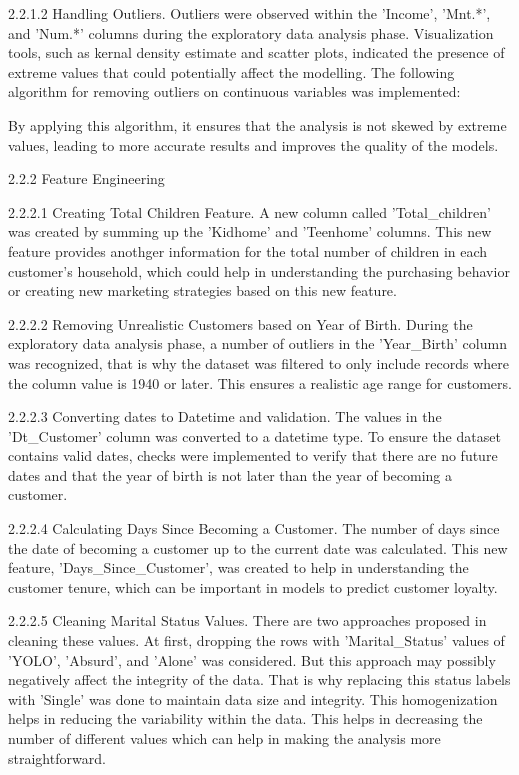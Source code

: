     2.2.1.2 Handling Outliers. Outliers were observed within the 'Income', 'Mnt.*', and 'Num.*' columns during the exploratory data analysis phase. Visualization tools, such as kernal density estimate and scatter plots, indicated the presence of extreme values that could potentially affect the modelling. The following algorithm for removing outliers on continuous variables was implemented:


    By applying this algorithm, it ensures that the analysis is not skewed by extreme values, leading to more accurate results and improves the quality of the models.

2.2.2 Feature Engineering

    2.2.2.1 Creating Total Children Feature. A new column called 'Total_children' was created by summing up the 'Kidhome' and 'Teenhome' columns. This new feature provides anothger information for the total number of children in each customer's household, which could help in understanding the purchasing behavior or creating new marketing strategies based on this new feature.

    2.2.2.2 Removing Unrealistic Customers based on Year of Birth. During the exploratory data analysis phase, a number of outliers in the 'Year_Birth' column was recognized, that is why the dataset was filtered to only include records where the column value is 1940 or later. This ensures a realistic age range for customers.

    2.2.2.3 Converting dates to Datetime and validation. The values in the 'Dt_Customer' column was converted to a datetime type. To ensure the dataset contains valid dates, checks were implemented to verify that there are no future dates and that the year of birth is not later than the year of becoming a customer.

    2.2.2.4 Calculating Days Since Becoming a Customer. The number of days since the date of becoming a customer up to the current date was calculated. This new feature, 'Days_Since_Customer', was created to help in understanding the customer tenure, which can be important in models to predict customer loyalty.

    2.2.2.5 Cleaning Marital Status Values. There are two approaches proposed in cleaning these values. At first, dropping the rows with 'Marital_Status' values of 'YOLO', 'Absurd', and 'Alone' was considered. But this approach may possibly negatively affect the integrity of the data. That is why replacing this status labels with 'Single' was done to maintain data size and integrity. This homogenization helps in reducing the variability within the data. This helps in decreasing the number of different values which can help in making the analysis more straightforward.

